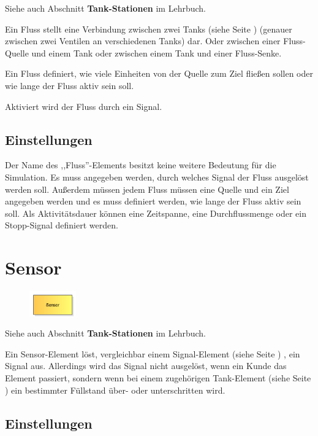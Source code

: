Siehe auch Abschnitt \textbf{Tank-Stationen} im Lehrbuch.

Ein Fluss stellt eine Verbindung zwischen zwei Tanks (siehe Seite \pageref{ref:ModelElementTank}) 
(genauer zwischen zwei Ventilen an verschiedenen Tanks) dar.
Oder zwischen einer Fluss-Quelle und einem Tank oder zwischen einem Tank und einer Fluss-Senke.

Ein Fluss definiert, wie viele Einheiten von der Quelle zum Ziel fließen sollen oder wie
lange der Fluss aktiv sein soll.

Aktiviert wird der Fluss durch ein Signal.

\subsection*{Einstellungen}

Der Name des ,,Fluss''-Elements besitzt keine weitere Bedeutung für die Simulation.
Es muss angegeben werden, durch welches Signal der Fluss ausgelöst werden soll.
Außerdem müssen jedem Fluss müssen eine Quelle und ein Ziel angegeben werden und es muss
definiert werden, wie lange der Fluss aktiv sein soll. Als Aktivitätsdauer
können eine Zeitspanne, eine Durchflussmenge oder ein Stopp-Signal definiert werden.


\section{Sensor}
\label{ref:ModelElementTankSensor}

\begin{figure}
\vspace{-22pt}
\includegraphics[width=2cm]{imageModelElementTankSensor.png}
\vspace{-22pt}
\end{figure}

Siehe auch Abschnitt \textbf{Tank-Stationen} im Lehrbuch.

Ein Sensor-Element löst, vergleichbar einem Signal-Element (siehe Seite \pageref{ref:ModelElementSignal}) ,
ein Signal aus. Allerdings wird das Signal nicht ausgelöst, wenn ein Kunde das Element
passiert, sondern wenn bei einem zugehörigen Tank-Element (siehe Seite \pageref{ref:ModelElementTank}) 
ein bestimmter Füllstand über- oder unterschritten wird. 

\subsection*{Einstellungen}

